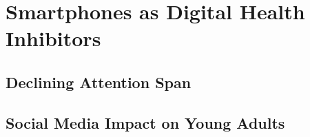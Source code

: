 \section{Smartphones as Digital Health Inhibitors}
\subsection{Declining Attention Span}
\subsection{Social Media Impact on Young Adults}

